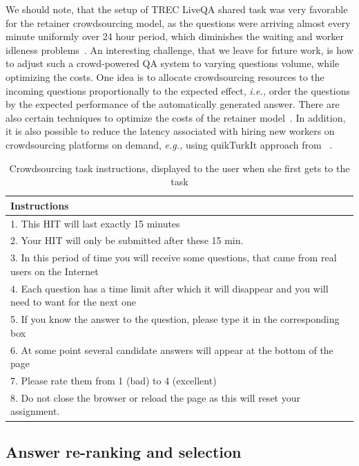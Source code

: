 \documentclass[letterpaper]{article}
\makeatletter
\newcommand{\eg}{\textit{e.g.,}\@\xspace}
\newcommand{\ie}{\textit{i.e.,}\@\xspace}
\makeatother
\begin{document}
We should note, that the setup of TREC LiveQA shared task was very favorable for the retainer crowdsourcing model, as the questions were arriving almost every minute uniformly over 24 hour period, which diminishes the waiting and worker idleness problems~\cite{Lasecki:2013:CCC:2501988.2502057}.
An interesting challenge, that we leave for future work, is how to adjust such a crowd-powered QA system to varying questions volume, while optimizing the costs.
One idea is to allocate crowdsourcing resources to the incoming questions proportionally to the expected effect, \ie order the questions by the expected performance of the automatically generated answer.
There are also certain techniques to optimize the costs of the retainer model~\cite{bernstein2012analytic}.
In addition, it is also possible to reduce the latency associated with hiring new workers on crowdsourcing platforms on demand, \eg using quikTurkIt approach from ~\cite{bigham2010vizwiz}.

\begin{table}[ht]
\centering
\begin{tabular}{| p{7.8cm} |}
\hline
\textbf{Instructions} \\
\hline
1. This HIT will last exactly 15 minutes\\
2. Your HIT will only be submitted after these 15 min.\\
3. In this period of time you will receive some questions, that came from real users on the Internet\\
4. Each question has a time limit after which it will disappear and you will need to want for the next one\\
5. If you know the answer to the question, please type it in the corresponding box\\
6. At some point several candidate answers will appear at the bottom of the page\\
7. Please rate them from 1 (bad) to 4 (excellent)\\
8. Do not close the browser or reload the page as this will reset your assignment.\\
\hline
\end{tabular}
\caption{Crowdsourcing task instructions, displayed to the user when she first gets to the task}
\label{table:crowd_instructions}
\end{table}

\subsection{Answer re-ranking and selection}
\label{sec:system:reranking}
\end{document}
